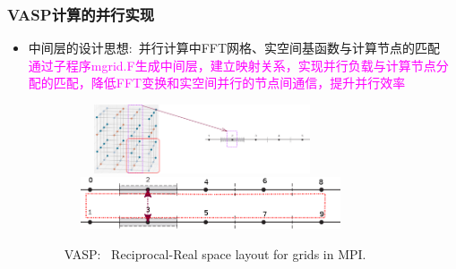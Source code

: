 \documentclass[cjk,slidestop,handout,compress,mathserif,blue]{beamer}	%
\begin{document}
\frame
{
	\frametitle{\textrm{VASP}计算的并行实现}
	\begin{itemize}
	     \item 中间层的设计思想:~并行计算中\textrm{FFT}网格、实空间基函数与计算节点的匹配\\
		     \textcolor{magenta}{通过子程序\textrm{mgrid.F}生成中间层，建立映射关系，实现并行负载与计算节点分配的匹配，降低\textrm{FFT}变换和实空间并行的节点间通信，提升并行效率}
\begin{figure}[h!]
	\vspace{-0.10in}
\centering
\includegraphics[height=0.8in,width=3.2in,viewport=0 0 1500 450,clip]{Figures/VASP_FFT-MPI_Reciprocal.png}
\vskip 0.5pt
\includegraphics[height=0.6in,width=3.4in,viewport=0 0 730 150,clip]{Figures/VASP_FFT-MPI_Real.png}
\caption{\tiny \textrm{VASP:~ Reciprocal-Real space layout for grids in MPI.}}%
\label{MPI-FFT}
\end{figure} 
	\end{itemize}
}

\end{document}
